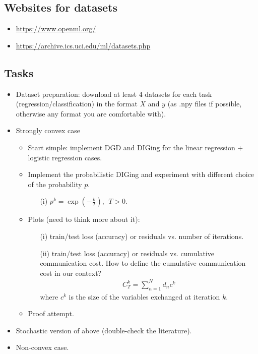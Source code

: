 \documentclass[12pt,draftclsnofoot,onecolumn]{IEEEtran}
\begin{document}
\subsection{Websites for datasets}
\begin{itemize}
\item \url{https://www.openml.org/}
\item \url{https://archive.ics.uci.edu/ml/datasets.php}
\end{itemize}

\subsection{Tasks}
\begin{itemize}
\item Dataset preparation: download at least 4 datasets for each task (regression/classification) in the format $X$ and $y$ (as .npy files if possible, otherwise any format you are comfortable with).
\item Strongly convex case
\begin{itemize}
\item Start simple: implement DGD and DIGing for the linear regression + logistic regression cases.
\item Implement the probabilistic DIGing and experiment with different choice of the probability $p$.
\begin{itemize}
\item[(i)] $p^k = \exp\left(-\frac{k}{T}\right), ~~ T > 0$.
\end{itemize}
\item Plots (need to think more about it): 
\begin{itemize}
\item[(i)] train/test loss (accuracy) or residuals vs. number of iterations.
\item[(ii)] train/test loss (accuracy) or residuals vs. cumulative communication cost. How to define the cumulative communication cost in our context?
\begin{align}
C_T^k = \sum_{n=1}^N d_n c^k
\end{align}
where $c^k$ is the size of the variables exchanged at iteration $k$.
\end{itemize}
\item Proof attempt.
\end{itemize}
\item Stochastic version of above (double-check the literature).
\item Non-convex case.
\end{itemize}

%
%
%
%
%
%

%
%
\end{document}
